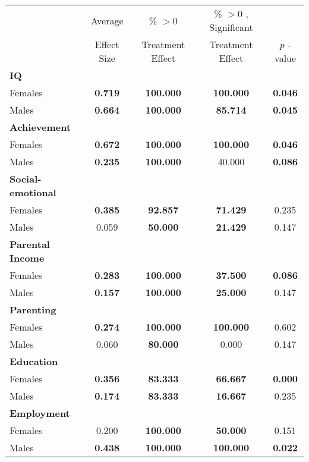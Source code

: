 \begin{tabular}{l c c c c}
\toprule
 & Average & \% $ >0 $ & \% $ >0 $ , Significant & \citet{Rosenbaum_2005_Distribution_JRSS} \\
 & Effect Size & Treatment Effect & Treatment Effect & $ p $ -value \\
\midrule
\textbf{IQ} & & & & \\
\quad Females &  \textbf{    0.719} & \textbf{  100.000} & \textbf{  100.000} & \textbf{ 0.046} \\
\quad Males &  \textbf{    0.664} & \textbf{  100.000} & \textbf{   85.714} & \textbf{ 0.045} \\
\midrule
\textbf{Achievement} & & & & \\
\quad Females &  \textbf{    0.672} & \textbf{  100.000} & \textbf{  100.000} & \textbf{ 0.046} \\
\quad Males &  \textbf{    0.235} & \textbf{  100.000} & 40.000 & \textbf{ 0.086} \\
\midrule
\textbf{Social-emotional} & & & & \\
\quad Females &  \textbf{    0.385} & \textbf{   92.857} & \textbf{   71.429} & 0.235 \\
\quad Males &      0.059 & \textbf{   50.000} & \textbf{   21.429} & 0.147 \\
\midrule
\textbf{Parental Income} & & & & \\
\quad Females & \textbf{    0.283} & \textbf{  100.000} & \textbf{   37.500}  & \textbf{ 0.086} \\
\quad Males &  \textbf{    0.157} & \textbf{  100.000} & \textbf{   25.000}  & 0.147 \\
\midrule
\textbf{Parenting} & & & & \\
\quad Females &  \textbf{    0.274} & \textbf{  100.000} & \textbf{   100.000} & 0.602 \\
\quad Males &      0.060 & \textbf{   80.000} &     0.000 & 0.147 \\
\midrule
\textbf{Education} & & & & \\
\quad Females &  \textbf{    0.356} & \textbf{   83.333} & \textbf{   66.667} & \textbf{ 0.000} \\
\quad Males &  \textbf{    0.174} & \textbf{   83.333} & \textbf{   16.667} & 0.235 \\
\midrule
\textbf{Employment} & & & & \\
\quad Females &      0.200 & \textbf{  100.000} & \textbf{   50.000} & 0.151 \\
\quad Males &  \textbf{    0.438} & \textbf{  100.000} & \textbf{  100.000} & \textbf{ 0.022} \\

\end{tabular}

